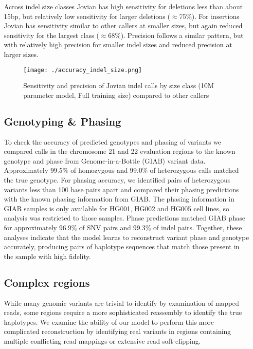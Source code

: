\documentclass[]{article}
\begin{document}
Across indel size classes Jovian has high sensitivity for deletions less than about 15bp, but relatively low sensitivity for larger deletions ($\approx$75\%). For insertions Jovian has sensitivity similar to other callers at smaller sizes, but again reduced sensitivity for the largest class ($\approx$68\%). Precision follows a similar pattern, but with relatively high precision for smaller indel sizes and reduced precision at larger sizes. 

\begin{figure}[htp]
	\texttt{[image: ./accuracy\_indel\_size.png]}
	\caption{ Sensitivity and precision of Jovian indel calls by size class (10M parameter model, Full training size) compared to other callers }
	\label{fig:indelsize-sens-ppv}
\end{figure}


\subsection{Genotyping \& Phasing}

To check the accuracy of predicted genotypes and phasing of variants we compared calls in the chromosome 21 and 22 evaluation regions to the known genotype and phase from Genome-in-a-Bottle (GIAB) variant data. Approximately 99.5\% of homozygous and 99.0\% of heterozygous calls matched the true genotype. For phasing accuracy, we identified pairs of heterozygous variants less than 100 base pairs apart and compared their phasing predictions with the known phasing information from GIAB. The phasing information in GIAB samples is only available for HG001, HG002 and HG005 cell lines, so analysis was restricted to those samples. Phase predictions matched GIAB phase for approximately 96.9\% of SNV pairs and 99.3\% of indel pairs. Together, these analyses indicate that the model learns to reconstruct variant phase and genotype accurately, producing pairs of haplotype sequences that match those present in the sample with high fidelity. 


\subsection{Complex regions}
While many genomic variants are trivial to identify by examination of mapped reads, some regions require a more sophisticated reassembly to identify the true haplotypes. We examine the ability of our model to perform this more complicated reconstruction by identifying real variants in regions containing multiple conflicting read mappings or extensive read soft-clipping. 
 
\end{document}
